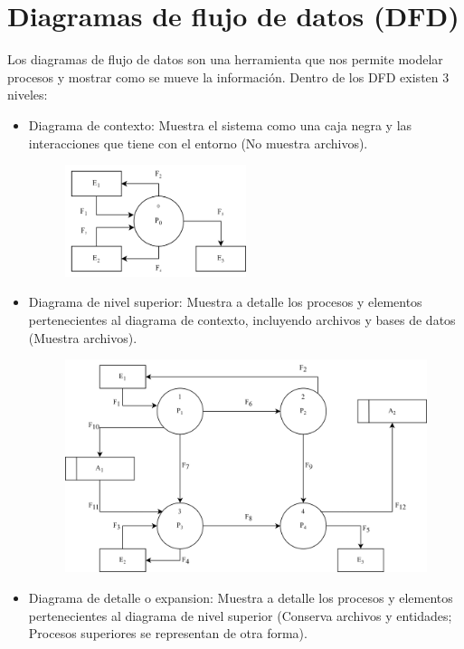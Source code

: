\documentclass{templateNote}
\begin{document}
\section{Diagramas de flujo de datos (\textbf{DFD})} 
\noindent Los diagramas de flujo de datos son una herramienta que nos permite modelar procesos y mostrar como se mueve la información. Dentro de los DFD existen 3 niveles:
\begin{itemize}
    \item Diagrama de contexto: Muestra el sistema como una caja negra y las interacciones que tiene con el entorno (No muestra archivos).
    \begin{figure}[H]
        \centering
        \includegraphics[width=0.5\textwidth]{img/contexto.png}
    \end{figure}
    \item Diagrama de nivel superior: Muestra a detalle los procesos y elementos pertenecientes al diagrama de contexto, incluyendo archivos y bases de datos (Muestra archivos).
    \begin{figure}[H]
        \centering
        \includegraphics[width=1\textwidth]{img/Superior.png}
    \end{figure}
    \item Diagrama de detalle o expansion: Muestra a detalle los procesos y elementos pertenecientes al diagrama de nivel superior (Conserva archivos y entidades; Procesos superiores se representan de otra forma).

\end{itemize}
\end{document}
